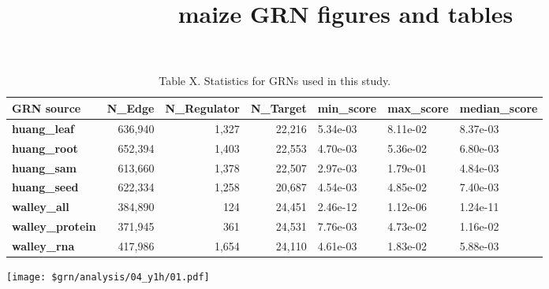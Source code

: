 \documentclass[11pt,]{article}
\title{maize GRN figures and tables  }
\author{}
\date{}
\let\origfigure\figure
\let\endorigfigure\endfigure
\renewenvironment{figure}[1][2] {
    \expandafter\origfigure\expandafter[H]
} {
    \endorigfigure
}
\begin{document}
    
%

{%
\setlength{\parindent}{0pt}
\thispagestyle{plain}
{\fontsize{18}{20}\selectfont\raggedright 
\maketitle  %

}

{
   \vskip 13.5pt\relax \normalsize\fontsize{11}{12} 
 

}

}






\vskip 6.5pt


\noindent  {}

\begin{table}[!h]

\caption{\label{tab:unnamed-chunk-1}Table X. Statistics for GRNs used in this study.}
\centering
\begin{tabular}[t]{>{\bfseries}lrrrlll}
\toprule
GRN source & N\_Edge & N\_Regulator & N\_Target & min\_score & max\_score & median\_score\\
\midrule
huang\_leaf & 636,940 & 1,327 & 22,216 & 5.34e-03 & 8.11e-02 & 8.37e-03\\
huang\_root & 652,394 & 1,403 & 22,553 & 4.70e-03 & 5.36e-02 & 6.80e-03\\
huang\_sam & 613,660 & 1,378 & 22,507 & 2.97e-03 & 1.79e-01 & 4.84e-03\\
huang\_seed & 622,334 & 1,258 & 20,687 & 4.54e-03 & 4.85e-02 & 7.40e-03\\
walley\_all & 384,890 & 124 & 24,451 & 2.46e-12 & 1.12e-06 & 1.24e-11\\
\addlinespace
walley\_protein & 371,945 & 361 & 24,531 & 7.76e-03 & 4.73e-02 & 1.16e-02\\
walley\_rna & 417,986 & 1,654 & 24,110 & 4.61e-03 & 1.83e-02 & 5.88e-03\\
\bottomrule
\end{tabular}
\end{table}

\pagebreak

\begin{figure}
\centering
\texttt{[image: \$grn/analysis/04\_y1h/01.pdf]}
\caption{Figure 1}
\end{figure}
\end{document}

